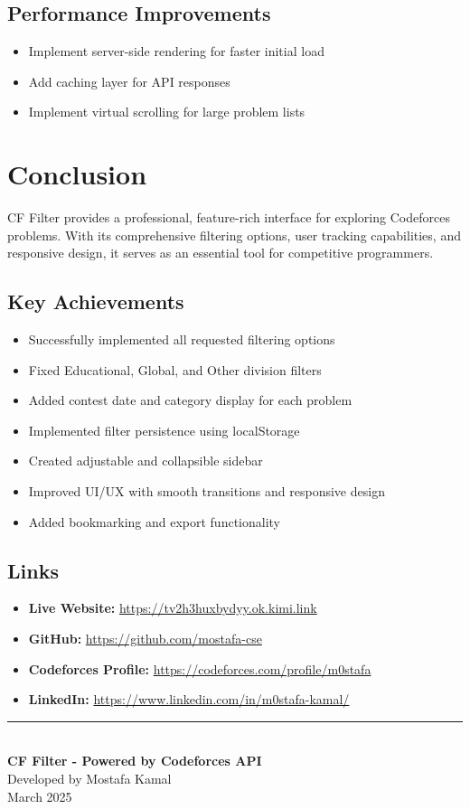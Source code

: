 \documentclass[12pt,a4paper]{article}
\begin{document}
\subsection{Performance Improvements}
\begin{itemize}[leftmargin=*]
    \item Implement server-side rendering for faster initial load
    \item Add caching layer for API responses
    \item Implement virtual scrolling for large problem lists
\end{itemize}

\newpage

\section{Conclusion}

CF Filter provides a professional, feature-rich interface for exploring Codeforces problems. With its comprehensive filtering options, user tracking capabilities, and responsive design, it serves as an essential tool for competitive programmers.

\subsection{Key Achievements}
\begin{itemize}[leftmargin=*]
    \item Successfully implemented all requested filtering options
    \item Fixed Educational, Global, and Other division filters
    \item Added contest date and category display for each problem
    \item Implemented filter persistence using localStorage
    \item Created adjustable and collapsible sidebar
    \item Improved UI/UX with smooth transitions and responsive design
    \item Added bookmarking and export functionality
\end{itemize}

\subsection{Links}
\begin{itemize}[leftmargin=*]
    \item \textbf{Live Website:} \url{https://tv2h3huxbydyy.ok.kimi.link}
    \item \textbf{GitHub:} \url{https://github.com/mostafa-cse}
    \item \textbf{Codeforces Profile:} \url{https://codeforces.com/profile/m0stafa}
    \item \textbf{LinkedIn:} \url{https://www.linkedin.com/in/m0stafa-kamal/}
\end{itemize}

\vfill
\begin{center}
    \textcolor{cfaccent}{\rule{0.5\textwidth}{0.5pt}}\\[0.5cm]
    \textcolor{cftext}{\textbf{CF Filter - Powered by Codeforces API}}\\[0.3cm]
    \textcolor{cftext}{Developed by Mostafa Kamal}\\[0.3cm]
    \textcolor{cftext}{March 2025}
\end{center}
\end{document}
